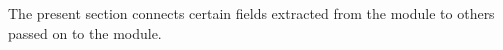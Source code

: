 The present section connects certain fields
extracted from the \rlpTxnMod{} module to
others passed on to the \hubMod{} module.
